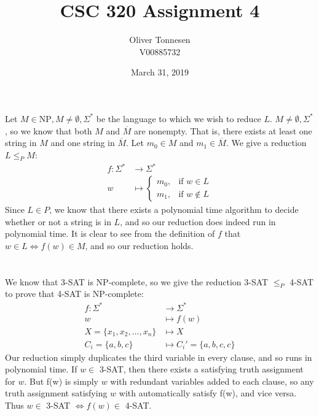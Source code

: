 \documentclass{article}
\title{CSC 320 Assignment 4}
\author{Oliver Tonnesen\\V00885732}
\date{March 31, 2019}
\begin{document}
\maketitle
\renewcommand{\thesubsection}{\thesection.\alph{subsection}}

\section{} %
Let $M\in \text{NP},M\neq\emptyset,\Sigma^*$ be the language to which we wish
to reduce $L$. $M\neq\emptyset,\Sigma^*$, so we know that both $M$ and
$\overline{M}$ are nonempty. That is, there exists at least one string in $M$
and one string in $\overline{M}$. Let $m_0\in M$ and $m_1\in\overline{M}$. We
give a reduction $L\le_P M$:
\begin{align*}
	f:\Sigma^*&\longrightarrow\Sigma^*\\
	w&\longmapsto
	\begin{cases}
		m_0, &\text{if }w\in L\\
		m_1, &\text{if }w\not\in L
	\end{cases}
\end{align*}
Since $L\in P$, we know that there exists a polynomial time algorithm to
decide whether or not a string is in $L$, and so our reduction does indeed
run in polynomial time.
\newline
\newline
It is clear to see from the definition of $f$ that $w\in L\iff f(w)\in M$, and
so our reduction holds.

\section{} %
We know that 3-SAT is NP-complete, so we give the reduction 3-SAT $\le_P$ 4-SAT
to prove that 4-SAT is NP-complete:
\begin{align*}
	f:\Sigma^*&\longrightarrow\Sigma^*\\
	w&\longmapsto f(w)\\
	X=\{x_1,x_2,\ldots,x_n\}&\longmapsto X\\
	C_i=\{a,b,c\}&\longmapsto C_i'=\{a,b,c,c\}
\end{align*}
Our reduction simply duplicates the third variable in every clause, and so runs
in polynomial time.
\newline
\newline
If $w\in$ 3-SAT, then there exists a satisfying truth assignment for $w$. But
f(w) is simply $w$ with redundant variables added to each clause, so any truth
assignment satisfying $w$ with automatically satisfy f(w), and vice versa. Thus
$w\in$ 3-SAT $\iff f(w)\in$ 4-SAT.
\end{document}
